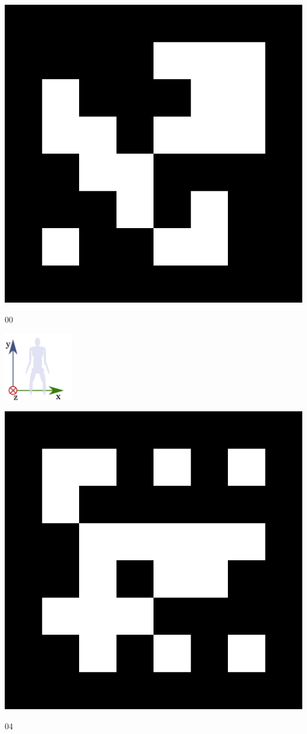 \vspace{5cm}
\begin{center}
\includegraphics[width=\textwidth, keepaspectratio]{aruco_00.png}
\caption{00}
\end{center}
\vspace{2cm}
\includegraphics[width=3cm, keepaspectratio]{origin_fig.png}
\newpage
\myemptypage
\vspace{5cm}
\begin{center}
\includegraphics[width=\textwidth, keepaspectratio]{aruco_04.png}
\caption{04}
\end{center}
